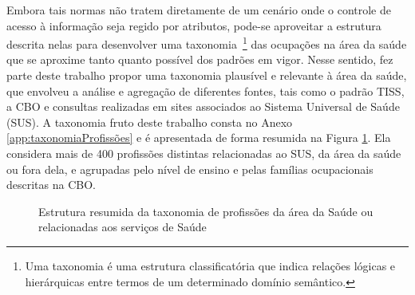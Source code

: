 \documentclass[a4paper,11pt]{article}
\begin{document}

Embora tais normas não tratem diretamente de um cenário onde o controle de acesso à informação seja regido por atributos, pode-se aproveitar a estrutura descrita nelas para desenvolver uma taxonomia~\footnote{Uma taxonomia é uma estrutura classificatória que indica relações lógicas e hierárquicas entre termos de um determinado domínio semântico.} das ocupações na área da saúde que se aproxime tanto quanto possível dos padrões em vigor. %
Nesse sentido, fez parte deste trabalho propor uma taxonomia plausível e relevante à área da saúde, que envolveu a análise e agregação de diferentes fontes, tais como o padrão TISS, a CBO e consultas realizadas em sites associados ao Sistema Universal de Saúde (SUS).
A taxonomia fruto deste trabalho consta no Anexo \ref{app:taxonomiaProfissões} e é apresentada de forma resumida na Figura \ref{fig:taxonomiaPermissoes}. %
Ela considera mais de 400 profissões distintas relacionadas ao SUS, da área da saúde ou fora dela, e agrupadas pelo nível de ensino e pelas famílias ocupacionais descritas na CBO.

\begin{figure}[h]
  \centering
  \caption{Estrutura resumida da taxonomia de profissões da área da Saúde ou relacionadas aos serviços de Saúde}
  \label{fig:taxonomiaPermissoes}

\end{figure}

\end{document}

